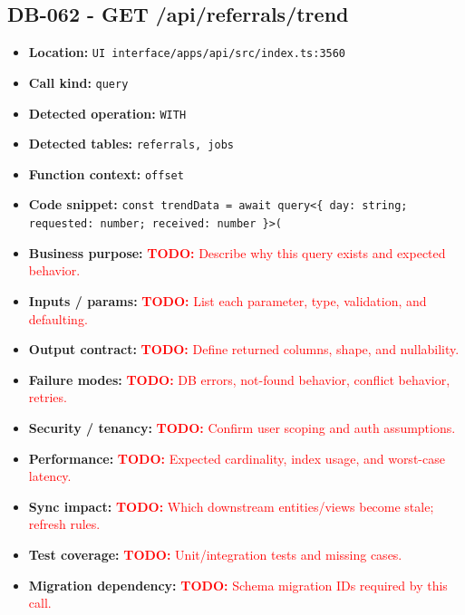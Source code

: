 \documentclass[11pt]{article}
\newcommand{\todoitem}[1]{\textcolor{red}{\textbf{TODO:} #1}}
\begin{document}
\subsection{DB-062 - GET /api/referrals/trend}
\begin{itemize}[leftmargin=1.5em]
\item \textbf{Location:} \texttt{UI interface/apps/api/src/index.ts:3560}
\item \textbf{Call kind:} \texttt{query}
\item \textbf{Detected operation:} \texttt{WITH}
\item \textbf{Detected tables:} \texttt{referrals, jobs}
\item \textbf{Function context:} \texttt{offset}
\item \textbf{Code snippet:} \texttt{const trendData = await query<\{ day: string; requested: number; received: number \}>(}
\item \textbf{Business purpose:} \todoitem{Describe why this query exists and expected behavior.}
\item \textbf{Inputs / params:} \todoitem{List each parameter, type, validation, and defaulting.}
\item \textbf{Output contract:} \todoitem{Define returned columns, shape, and nullability.}
\item \textbf{Failure modes:} \todoitem{DB errors, not-found behavior, conflict behavior, retries.}
\item \textbf{Security / tenancy:} \todoitem{Confirm user scoping and auth assumptions.}
\item \textbf{Performance:} \todoitem{Expected cardinality, index usage, and worst-case latency.}
\item \textbf{Sync impact:} \todoitem{Which downstream entities/views become stale; refresh rules.}
\item \textbf{Test coverage:} \todoitem{Unit/integration tests and missing cases.}
\item \textbf{Migration dependency:} \todoitem{Schema migration IDs required by this call.}
\end{itemize}
\end{document}
